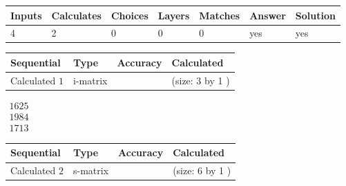 \documentclass[12pt]{article}
\begin{document}
 
 
\noindent{}
 
 

 
 
 
\noindent{}
 
 

 
 
\noindent{}
 
 

 
\vspace{0.3in}
   
   
   
   
\noindent\begin{tabular}{|l|l|l|l|l|l|l|}
 \hline
Inputs & Calculates & Choices & Layers & Matches & Answer & Solution \\ \hline
           4  & 
           2  & 
           0
  & 
           0  & 
           0  & 
  yes & 
  yes 
  \\ \hline
 \end{tabular}
   
   
   
   
\noindent{}
   
   
  
  
\noindent\begin{tabular}{|l|l|l|l|}
\hline
 Sequential & Type & Accuracy & Calculated \\ 
\hline
 
 
  Calculated $            1 $ & i-matrix &  & 
 (size:            3  by            1 )
 \\  \hline  
 \end{tabular}
   
   
$\begin{array}{
 c
 }
        1625  \\ 
        1984  \\ 
        1713
 \end{array}  $ 
  
  
\noindent\begin{tabular}{|l|l|l|l|}
\hline
 Sequential & Type & Accuracy & Calculated \\ 
\hline
 
 
  Calculated $            2 $ & s-matrix & & 
 (size:            6  by            1 )
 \\  \hline  
 \end{tabular}
   
\end{document}
